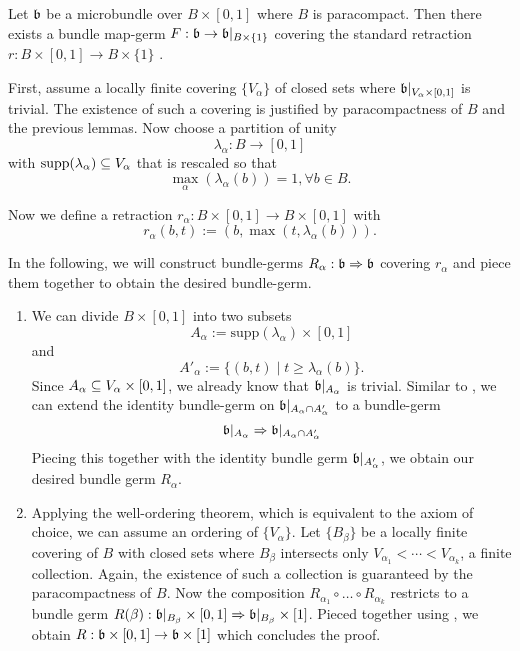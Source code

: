\begin{file}
\begin{mylemma}\label{homotopy::lemma3}
    Let $\bb$ be a microbundle over $B \times [0, 1]$ where $B$ is paracompact.
    Then there exists a bundle map-germ $F: \bb \to \bb\restr{B \times \{1\}}$
    covering the standard retraction $r: B \times [0, 1] \to B \times \{1\}$ .
\end{mylemma}
\begin{myproof}
    First, assume a locally finite covering $\{V_\alpha\}$ of closed sets where $\bb\restr{V_\alpha \times [0, 1]}$ is trivial.
    The existence of such a covering is justified by paracompactness of $B$ and the previous lemmas.
    Now choose a partition of unity
    \[ \lambda_\alpha: B \to [0, 1] \]
    with $\text{supp}(\lambda_\alpha) \sub V_\alpha$ that is rescaled so that
    \[ \max_{\alpha}(\lambda_\alpha(b)) = 1, \forall b \in B. \]
    
    Now we define a retraction $r_\alpha: B \times [0, 1] \to B \times [0, 1]$ with
    \[ r_\alpha(b, t) := (b, \max(t, \lambda_\alpha(b))). \]

    In the following, we will construct bundle-germs $R_\alpha: \bb \double \bb$ covering $r_\alpha$
    and piece them together to obtain the desired bundle-germ.
    \begin{enumerate}
        \item 
        We can divide $B \times [0, 1]$ into two subsets
        \[ A_\alpha := \text{supp}(\lambda_\alpha) \times [0, 1] \]
        and
        \[ A'_\alpha := \{(b, t) \mid t \ge \lambda_\alpha(b)\}. \]
        Since $A_\alpha \sub V_\alpha \times [0, 1]$, we already know that $\bb\restr{A_\alpha}$ is trivial.
        Similar to , we can extend the identity bundle-germ on $\bb\restr{\A \cap \A[']}$ to a bundle-germ
        \[ \bb\restr{\A} \double \bb\restr{\A \cap \A[']} \]
        Piecing this together with the identity bundle germ $\bb\restr{\A[']}$, we obtain our desired bundle germ $R_\alpha$.
        
        \item
        Applying the well-ordering theorem, which is equivalent to the axiom of choice, we can assume an ordering of $\{ V_\alpha \}$.
        Let $\{B_\beta\}$ be a locally finite covering of $B$ with closed sets where $B_\beta$ intersects only $V_{\alpha_1} < \cdots < V_{\alpha_k}$, a finite collection.
        Again, the existence of such a collection is guaranteed by the paracompactness of $B$. 
        Now the composition $R_{\alpha_1} \circ \ldots \circ R_{\alpha_k}$ restricts to a bundle germ $R(\beta): \bb\restr{B_\beta} \times [0, 1] \double \bb\restr{B_\beta} \times [1]$.
        Pieced together using , we obtain $R: \bb \times [0, 1]\to \bb \times [1]$ which concludes the proof.
    \end{enumerate}    
\end{myproof}


\end{file}
